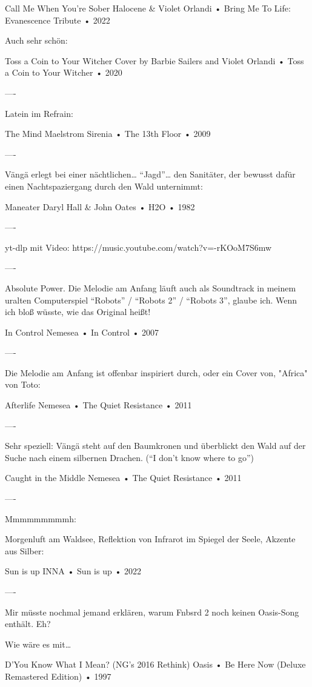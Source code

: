 Call Me When You're Sober
Halocene
 &
Violet Orlandi
 •
Bring Me To Life: Evanescence Tribute
 •
2022

Auch sehr schön:

Toss a Coin to Your Witcher
Cover by Barbie Sailers and Violet Orlandi
 •
Toss a Coin to Your Witcher
 •
2020

----

Latein im Refrain:

The Mind Maelstrom
Sirenia
 •
The 13th Floor
 •
2009

----

Vängä erlegt bei einer nächtlichen… “Jagd”… den Sanitäter, der bewusst dafür einen Nachtspaziergang durch den Wald unternimmt:

Maneater
Daryl Hall & John Oates
 •
H2O
 •
1982

----

yt-dlp mit Video:
https://music.youtube.com/watch?v=-rKOoM7S6mw

----

Absolute Power. Die Melodie am Anfang läuft auch als Soundtrack in meinem uralten Computerspiel “Robots” / “Robots 2” / “Robots 3”, glaube ich. Wenn ich bloß wüsste, wie das Original heißt!

In Control
Nemesea
 •
In Control
 •
2007

----

Die Melodie am Anfang ist offenbar inspiriert durch, oder ein Cover von, "Africa" von Toto:

Afterlife
Nemesea
 •
The Quiet Resistance
 •
2011

----

Sehr speziell: Vängä steht auf den Baumkronen und überblickt den Wald auf der Suche nach einem silbernen Drachen. (“I don’t know where to go”)

Caught in the Middle
Nemesea
 •
The Quiet Resistance
 •
2011

----

Mmmmmmmmmh:

Morgenluft am Waldsee, Reflektion von Infrarot im Spiegel der Seele, Akzente aus Silber:

Sun is up
INNA
 •
Sun is up
 •
2022

----

Mir müsste nochmal jemand erklären, warum Fnbsrd 2 noch keinen Oasis-Song enthält. Eh?

Wie wäre es mit…

D'You Know What I Mean? (NG's 2016 Rethink)
Oasis
 •
Be Here Now (Deluxe Remastered Edition)
 •
1997

